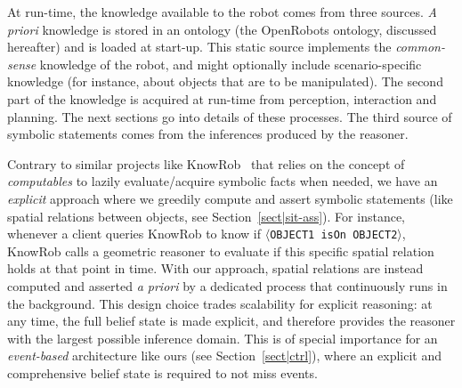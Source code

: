 \documentclass[preprint,3p,times]{elsarticle}
\newcommand{\stmt}[1]{{\footnotesize\tt$\langle$#1\relax$\rangle$}}
\begin{document}
At run-time, the knowledge available to the robot comes from three sources. {\it
A priori} knowledge is stored in an ontology (the {\sc OpenRobots} ontology,
discussed hereafter) and is loaded at start-up. This static source implements the
\emph{common-sense} knowledge of the robot, and might optionally include 
scenario-specific knowledge (for instance, about objects that are to be
manipulated). The second part of the knowledge is acquired at run-time from
perception, interaction and planning. The next sections go into details of these
processes. The third source of symbolic statements comes from the
inferences produced by the reasoner.

Contrary to similar projects like KnowRob~\cite{Tenorth2009a} that relies on the
concept of \emph{computables} to lazily evaluate/acquire symbolic facts when
needed, we have an \emph{explicit} approach where we greedily compute and assert
symbolic statements (like spatial relations between objects, see
Section~\ref{sect|sit-ass}). For instance, whenever a client queries KnowRob to
know if \stmt{OBJECT1 isOn OBJECT2}, KnowRob calls a geometric reasoner to
evaluate if this specific spatial relation holds at that point in time. With our
approach, spatial relations are instead computed and asserted {\it a priori} by
a dedicated process that continuously runs in the background.
This design choice trades scalability for explicit reasoning: at any time, the
full belief state is made explicit, and
therefore provides the reasoner with the largest possible inference domain. This
is of special importance for an \emph{event-based} architecture like ours (see
Section~\ref{sect|ctrl}), where an explicit and comprehensive belief state is
required to not miss events.
\end{document}
